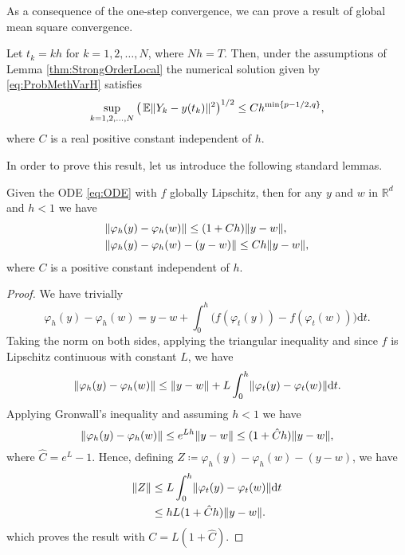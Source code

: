 \documentclass{siamart1116}
\numberwithin{theorem}{section}
\DeclarePairedDelimiter{\norm}{\|}{\|}
\renewcommand{\phi}{\varphi}
\newcommand{\R}{\mathbb{R}}
\newcommand{\defeq}{\coloneqq}
\newcommand{\E}{\operatorname{\mathbb{E}}}
\newcommand{\dd}{\mathrm{d}}
\begin{document}
As a consequence of the one-step convergence, we can prove a result of global mean square convergence.
\begin{theorem}\label{thm:StrongOrder} Let $t_k = kh$ for $k = 1, 2, \ldots, N$, where $Nh = T$. Then, under the assumptions of Lemma \ref{thm:StrongOrderLocal} the numerical solution given by \eqref{eq:ProbMethVarH} satisfies 
	\begin{equation}\label{eq:StrongGlobalClaim}
		\sup_{k=1,2, \ldots, N} \big(\E\norm{Y_k - y(t_k)}^2\big)^{1/2} \leq C h^{\min\{p-1/2, q\}},
	\end{equation}
	where $C$ is a real positive constant independent of $h$. 
\end{theorem}
In order to prove this result, let us introduce the following standard lemmas.
\begin{lemma}\label{lem:ODERepresentation} Given the ODE \eqref{eq:ODE} with $f$ globally Lipschitz, then for any $y$ and $w$ in $\R^d$ and $h < 1$ we have
	\begin{align}
		&\norm{\phi_h(y) - \phi_h(w)} \leq (1 + Ch) \norm{y - w},\\
		&\norm{\phi_h(y) - \phi_h(w) - (y - w)} \leq Ch\norm{y - w},
	\end{align}
	where $C$ is a positive constant independent of $h$.
\end{lemma}
\begin{proof} We have trivially
	\begin{equation}
		\phi_h(y) - \phi_h(w) = y - w + \int_{0}^{h}\big(f(\phi_t(y)) - f(\phi_t(w))\big) \dd t.
	\end{equation}
	Taking the norm on both sides, applying the triangular inequality and since $f$ is Lipschitz continuous with constant $L$, we have
	\begin{equation}
		\norm{\phi_h(y) - \phi_h(w)} \leq \norm{y - w} + L\int_{0}^{h}\norm{\phi_t(y) - \phi_t(w)} \dd t.
	\end{equation}
	Applying Gronwall's inequality and assuming $h < 1$ we have
	\begin{equation}
		\norm{\phi_h(y) - \phi_h(w)} \leq e^{Lh} \norm{y - w}  \leq (1 + \hat C h) \norm{y - w},
	\end{equation}
	where $\hat C = e^L - 1$. Hence, defining $Z \defeq \phi_h(y) - \phi_h(w) - (y - w)$, we have
	\begin{equation}
	\begin{aligned}
		\norm{Z} &\leq L\int_{0}^{h} \norm{\phi_t(y) - \phi_t(w)} \dd t\\
		&\leq h L(1 + \hat C h) \norm{y - w}.
	\end{aligned}
	\end{equation}
	which proves the result with $C = L(1 + \hat C)$.	
\end{proof}
\end{document}
